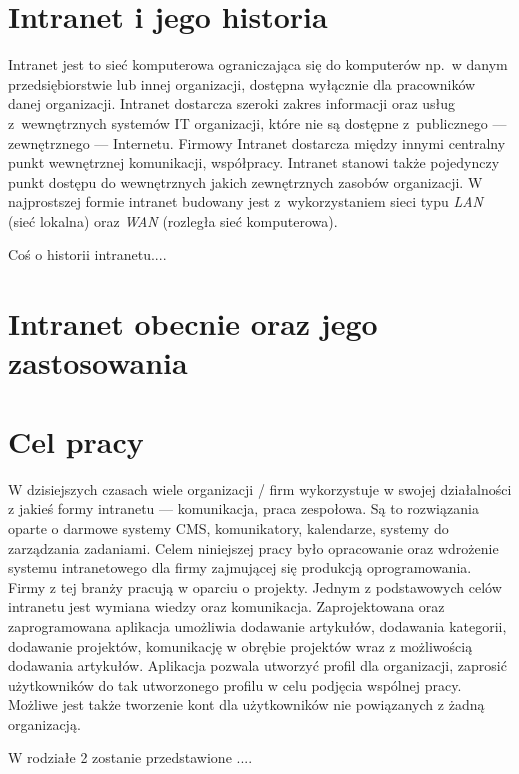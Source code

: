 \section{Intranet i jego historia}

Intranet jest to sieć komputerowa ograniczająca się do komputerów np.\ w danym przedsiębiorstwie lub innej organizacji, dostępna wyłącznie dla
pracowników danej organizacji. Intranet dostarcza szeroki zakres informacji oraz usług z~wewnętrznych systemów IT organizacji, które nie są
dostępne z~publicznego --- zewnętrznego --- Internetu. Firmowy Intranet dostarcza między innymi centralny punkt wewnętrznej komunikacji, współpracy. 
Intranet stanowi także pojedynczy punkt dostępu do wewnętrznych jakich zewnętrznych zasobów organizacji. W najprostszej formie intranet budowany
jest z~wykorzystaniem sieci typu \emph{LAN} (sieć lokalna) oraz \emph{WAN} (rozległa sieć komputerowa)\cite{intranetWiki}.

Coś o historii intranetu....

\section{Intranet obecnie oraz jego zastosowania}


\section{Cel pracy}

W dzisiejszych czasach wiele organizacji / firm wykorzystuje w swojej działalności z jakieś formy intranetu --- komunikacja, praca zespołowa. 
Są to rozwiązania oparte o darmowe systemy CMS, komunikatory, kalendarze, systemy do zarządzania zadaniami. Celem niniejszej pracy było opracowanie
oraz wdrożenie systemu intranetowego dla firmy zajmującej się produkcją oprogramowania. Firmy z tej branży pracują w oparciu o projekty. Jednym z
podstawowych celów intranetu jest wymiana wiedzy oraz komunikacja. Zaprojektowana oraz zaprogramowana aplikacja umożliwia dodawanie artykułów,
dodawania kategorii, dodawanie projektów, komunikację w obrębie projektów wraz z możliwością dodawania artykułów. Aplikacja pozwala utworzyć profil 
dla organizacji, zaprosić użytkowników do tak utworzonego profilu w celu podjęcia wspólnej pracy. Możliwe jest także tworzenie kont dla użytkowników
nie powiązanych z żadną organizacją.

W rodziałe 2 zostanie przedstawione ....


